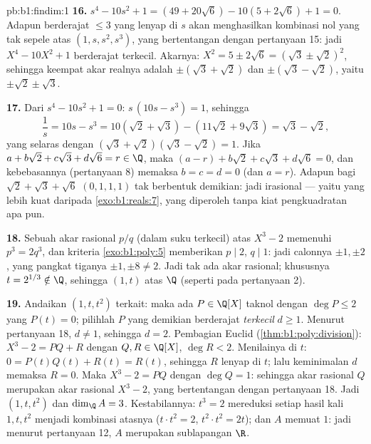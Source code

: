 \begin{solution}{pb:b1:findim:1}
\textbf{16.} $s^4 - 10s^2 + 1 = (49 + 20\sqrt6) - 10(5 +
2\sqrt6) + 1 = 0$. Adapun  berderajat $\leq 3$
yang lenyap di $s$ akan menghasilkan kombinasi nol yang tak sepele atas
$(1, s, s^2, s^3)$, yang bertentangan dengan pertanyaan 15: jadi $X^4 - 10X^2 + 1$
berderajat terkecil. Akarnya: $X^2 = 5 \pm 2\sqrt6 = (\sqrt3 \pm
\sqrt2)^2$, sehingga keempat akar realnya adalah $\pm(\sqrt3 + \sqrt2)$ dan
$\pm(\sqrt3 - \sqrt2)$, yaitu $\pm\sqrt2 \pm \sqrt3$.

\textbf{17.} Dari $s^4 - 10s^2 + 1 = 0$: $s\,(10s - s^3) = 1$, sehingga
\[
\frac1s = 10s - s^3 = 10(\sqrt2 + \sqrt3) - (11\sqrt2 + 9\sqrt3)
= \sqrt3 - \sqrt2 ,
\]
yang selaras dengan $(\sqrt3 + \sqrt2)(\sqrt3 - \sqrt2) = 1$. Jika $a +
b\sqrt2 + c\sqrt3 + d\sqrt6 = r \in \Q$, maka $(a - r) + b\sqrt2
+ c\sqrt3 + d\sqrt6 = 0$, dan kebebasannya (pertanyaan 8) memaksa $b = c
= d = 0$ (dan $a = r$). Adapun bagi $\sqrt2 + \sqrt3 + \sqrt6$
 $(0, 1, 1, 1)$ tak berbentuk demikian: jadi irasional ---
yaitu  yang lebih kuat daripada \cref{exo:b1:reals:7}, yang diperoleh tanpa
kiat pengkuadratan apa pun.

\textbf{18.} Sebuah akar rasional $p/q$ (dalam suku terkecil) atas $X^3 - 2$
memenuhi $p^3 = 2q^3$, dan kriteria
\cref{exo:b1:poly:5} memberikan $p \mid 2$, $q \mid 1$: jadi calonnya
$\pm1, \pm2$, yang pangkat tiganya $\pm1, \pm8 \neq 2$. Jadi tak ada akar
rasional; khususnya $t = 2^{1/3} \notin \Q$, sehingga $(1, t)$ 
atas $\Q$ (seperti pada pertanyaan 2).

\textbf{19.} Andaikan $(1, t, t^2)$ terkait: maka ada $P \in
\Q[X]$ taknol dengan $\deg P \leq 2$ yang $P(t) = 0$; pilihlah $P$ yang demikian
berderajat \emph{terkecil} $d \geq 1$. Menurut pertanyaan 18, $d \neq 1$, sehingga $d
= 2$. Pembagian Euclid (\cref{thm:b1:poly:division}): $X^3 - 2
= PQ + R$ dengan $Q, R \in \Q[X]$, $\deg R < 2$. Menilainya di $t$:
$0 = P(t)Q(t) + R(t) = R(t)$, sehingga $R$ lenyap di $t$; lalu keminimalan
$d$ memaksa $R = 0$. Maka $X^3 - 2 = PQ$ dengan $\deg Q = 1$: sehingga
akar rasional $Q$ merupakan akar rasional $X^3 - 2$,
yang bertentangan dengan pertanyaan 18. Jadi $(1, t, t^2)$  dan
$\dim_\Q A = 3$. Kestabilannya: $t^3 = 2$ mereduksi setiap hasil kali
$1, t, t^2$ menjadi kombinasi atasnya ($t\cdot t^2 = 2$, $t^2\cdot
t^2 = 2t$); dan $A$ memuat $1$: jadi menurut pertanyaan 12, $A$ merupakan sublapangan
$\R$.


\end{solution}

